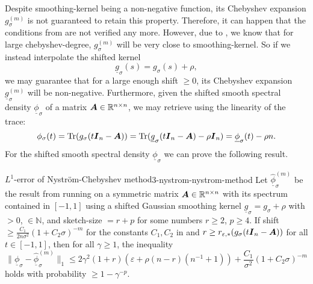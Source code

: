 Despite \gls{smoothing-kernel} being a non-negative function, its Chebyshev
expansion $g_{\sigma}^{(m)}$ is not guaranteed to retain this property.
Therefore, it can happen that the conditions from 
are not verified any more.
However, due to , we know that for large
\gls{chebyshev-degree}, $g_{\sigma}^{(m)}$ will be very close to \gls{smoothing-kernel}.
So if we instead interpolate the shifted kernel
\begin{equation}
    \underline{g}_{\sigma}(s) = g_{\sigma}(s) + \rho,
    \label{equ:3-nystrom-up-shifted-kernel}
\end{equation}
we may guarantee that for a large enough \gls{shift} $\geq 0$, its Chebyshev expansion
$\underline{g}_{\sigma}^{(m)}$ will be non-negative. Furthermore, given
the shifted smooth spectral density $\underline{\phi}_{\sigma}$ of a matrix $\boldsymbol{A} \in \mathbb{R}^{n \times n}$,
we may retrieve  using the linearity of the trace:
\begin{equation}
    \phi_{\sigma}(t)
    = \operatorname{Tr}(g_{\sigma}(t\boldsymbol{I}_n - \boldsymbol{A}))
    = \operatorname{Tr}(\underline{g}_{\sigma}(t\boldsymbol{I}_n - \boldsymbol{A}) - \rho \boldsymbol{I}_n)
    = \underline{\phi}_{\sigma}(t) - \rho n.
    \label{equ:3-nystrom-revert-shift}
\end{equation}
For the shifted smooth spectral density $\underline{\phi}_{\sigma}$ we can prove the following result.
\begin{theorem}{$L^1$-error of Nystr\"om-Chebyshev method}{3-nystrom-nystrom-method}
    Let $\widehat{\underline{\phi}}_{\sigma}^{(m)}$ be the result from running
     on a symmetric matrix
    $\boldsymbol{A} \in \mathbb{R}^{n \times n}$ with its spectrum contained in $[-1, 1]$
    using a shifted Gaussian smoothing kernel $\underline{g}_{\sigma} = g_{\sigma} + \rho$
    with  $>0$,  $\in \mathbb{N}$, and
    \gls{sketch-size} $=r + p$ for some numbers $r \geq 2$, $p \geq 4$.
    If \gls{shift} $\geq \frac{C_1}{2n\sigma^2} (1 + C_2 \sigma)^{-m}$ for the constants
    $C_1, C_2$ in 
    and $r \geq r_{\varepsilon, \ast}(g_{\sigma}(t\boldsymbol{I}_n - \boldsymbol{A}))$ for all
    $t \in [-1, 1]$, then for all $\gamma \geq 1$, the inequality
    \begin{equation}
        \lVert \underline{\phi}_{\sigma} - \widehat{\underline{\phi}}_{\sigma}^{(m)} \rVert _1
        \leq 2 \gamma^2(1 + r) ( \varepsilon + \rho (n - r) (n^{-1} + 1) )
        + \frac{C_1}{\sigma^2} (1 + C_2 \sigma)^{-m}
    \end{equation}
    holds with probability $\geq 1-\gamma^{-p}$.
\end{theorem}

